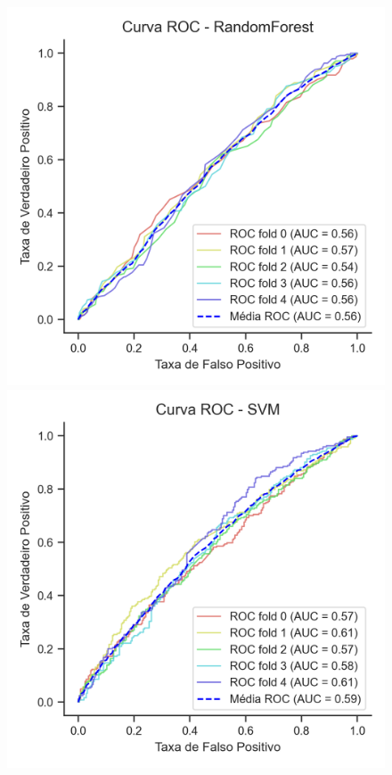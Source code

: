 \begin{figure}[htb]
	\bigskip %
	
	\begin{minipage}[t]{0.28\textwidth}
		\centering
		\includegraphics[width=\textwidth]{USPSC-img/Curva ROC - RandomForest.png}
	\end{minipage}
	\hfill
	\begin{minipage}[t]{0.28\textwidth}
		\centering
		\includegraphics[width=\textwidth]{USPSC-img/Curva ROC - SVM.png}

\end{minipage}
\end{figure}
